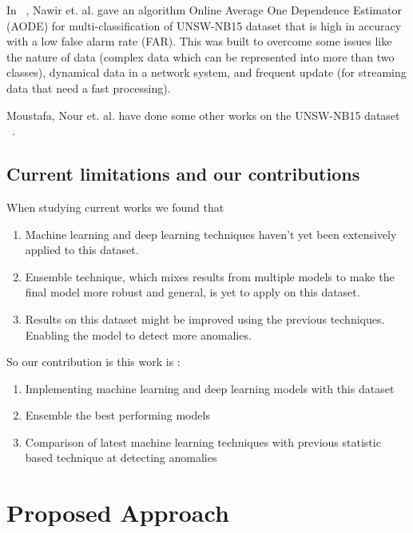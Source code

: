 \documentclass[14pt, conference]{IEEEtran}
\begin{document}
In ~\cite{nawir2018multi}, Nawir et. al. gave an algorithm Online Average One Dependence Estimator (AODE) for multi-classification of UNSW-NB15 dataset that is high in accuracy with a low false alarm rate (FAR). This was built to overcome some issues like the nature of data (complex data which can be represented into more than two classes), dynamical data in a network system, and frequent update (for streaming data that need a
fast processing).

Moustafa, Nour et. al. have done some other works on the UNSW-NB15 dataset ~\cite{moustafa2018ensemble, moustafa2018generalized, moustafa2018network}.

\subsection{Current limitations and our contributions}
When studying current works we found that
\begin{enumerate}
    \item Machine learning and deep learning techniques haven't yet been extensively applied to this dataset.
    \item Ensemble technique, which mixes results from multiple models to make the final model more robust and general, is yet to apply on this dataset.
    \item Results on this dataset might be improved using the previous techniques. Enabling the model to detect more anomalies.
\end{enumerate}

So our contribution is this work is :
\begin{enumerate}
    \item Implementing machine learning and deep learning models with this dataset
    \item Ensemble the best performing models
    \item Comparison of latest machine learning techniques with previous statistic based technique at detecting anomalies
\end{enumerate}






\section{Proposed Approach}
\end{document}

